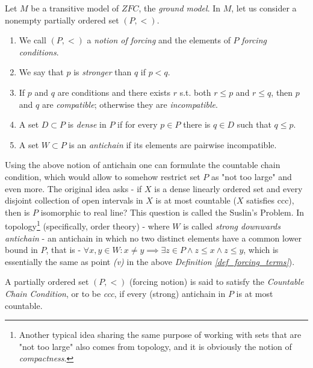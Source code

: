 \begin{definition}\label{def_forcing_terms}
  Let $M$ be a transitive model of $ZFC$, the \textit{ground model}. In $M$, let us consider a nonempty partially ordered set $(P,<)$.
  \begin{enumerate}[label=(\roman*)]
    \item We call $(P,<)$ a \textit{notion of forcing} and the elements of $P$ \textit{forcing conditions}.
    \item We say that $p$ is \textit{stronger} than $q$ if $p < q$.
    \item If $p$ and $q$ are conditions and there exists $r$ s.t. both $r \leq p$ and
    $r \leq q$, then $p$ and $q$ are \textit{compatible}; otherwise they are \textit{incompatible}. 
    \item A set $D \subset P$ is \textit{dense} in $P$ if for every $p \in P$ there is $q \in D$ such that $q ≤ p$.
    \item A set $W \subset P$ is an \textit{antichain} if its elements are pairwise incompatible.
  \end{enumerate}
\end{definition}

Using the above notion of antichain one can formulate the countable chain condition, which would allow to somehow restrict set $P$ as "not too large" and even more. The original idea asks - if $X$ is a dense linearly ordered set and every disjoint collection of open intervals in $X$ is at most countable ($X$ satisfies ccc), then is $P$ isomorphic to real line? This question is called the Suslin's Problem. In topology\footnote{Another typical idea sharing the same purpose of working with sets that are "not too large" also comes from topology, and it is obviously the notion of \textit{compactness}.} (specifically, order theory) - where $W$ is called \textit{strong downwards antichain} - an antichain in which no two distinct elements have a common lower bound in $P$, that is - $\forall x,y \in W: x \neq y \implies \exists z \in P \land z \leq x \land z \leq y$, which is essentially the same as point \textit{(v)} in the above \textit{Definition \ref{def_forcing_terms}}). 

\begin{definition}\label{def_forcing_ccc}
A partially ordered set  $(P,<)$ (forcing notion) is said to satisfy the \textit{Countable Chain Condition}, or to be \textit{ccc}, if every (strong) antichain in $P$ is at most countable.
\end{definition}

